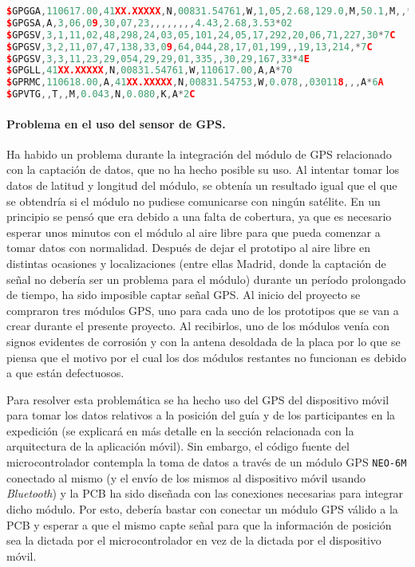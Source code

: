 \begin{lstlisting}[language=c++,captionpos=t,caption={\textbf{Ejemplo de valores en formato \ac{NMEA}.}},label={lst:nmeavals}]
$GPGGA,110617.00,41XX.XXXXX,N,00831.54761,W,1,05,2.68,129.0,M,50.1,M,,*42
$GPGSA,A,3,06,09,30,07,23,,,,,,,,4.43,2.68,3.53*02
$GPGSV,3,1,11,02,48,298,24,03,05,101,24,05,17,292,20,06,71,227,30*7C
$GPGSV,3,2,11,07,47,138,33,09,64,044,28,17,01,199,,19,13,214,*7C
$GPGSV,3,3,11,23,29,054,29,29,01,335,,30,29,167,33*4E
$GPGLL,41XX.XXXXX,N,00831.54761,W,110617.00,A,A*70
$GPRMC,110618.00,A,41XX.XXXXX,N,00831.54753,W,0.078,,030118,,,A*6A 
$GPVTG,,T,,M,0.043,N,0.080,K,A*2C
\end{lstlisting}

\paragraph{Problema en el uso del sensor de \ac{GPS}.}

Ha habido un problema durante la integración del módulo de \ac{GPS} relacionado con la captación de datos, que no ha hecho posible su uso. Al intentar tomar los datos de latitud y longitud del módulo, se obtenía un resultado igual que el que se obtendría si el módulo no pudiese comunicarse con ningún satélite. En un principio se pensó que era debido a una falta de cobertura, ya que es necesario esperar unos minutos con el módulo al aire libre para que pueda comenzar a tomar datos con normalidad. Después de dejar el prototipo al aire libre en distintas ocasiones y localizaciones (entre ellas Madrid, donde la captación de señal no debería ser un problema para el módulo) durante un período prolongado de tiempo, ha sido imposible captar señal \ac{GPS}. Al inicio del proyecto se compraron tres módulos \ac{GPS}, uno para cada uno de los prototipos que se van a crear durante el presente proyecto. Al recibirlos, uno de los módulos venía con signos evidentes de corrosión y con la antena desoldada de la placa por lo que se piensa que el motivo por el cual los dos módulos restantes no funcionan es debido a que están defectuosos.

Para resolver esta problemática se ha hecho uso del \ac{GPS} del dispositivo móvil para tomar los datos relativos a la posición del guía y de los participantes en la expedición (se explicará en más detalle en la sección relacionada con la arquitectura de la aplicación móvil). Sin embargo, el código fuente del microcontrolador contempla la toma de datos a través de un módulo \ac{GPS} \texttt{NEO-6M} conectado al mismo (y el envío de los mismos al dispositivo móvil usando \textit{Bluetooth}) y la \ac{PCB} ha sido diseñada con las conexiones necesarias para integrar dicho módulo. Por esto, debería bastar con conectar un módulo \ac{GPS} válido a la \ac{PCB} y esperar a que el mismo capte señal para que la información de posición sea la dictada por el microcontrolador en vez de la dictada por el dispositivo móvil. 

